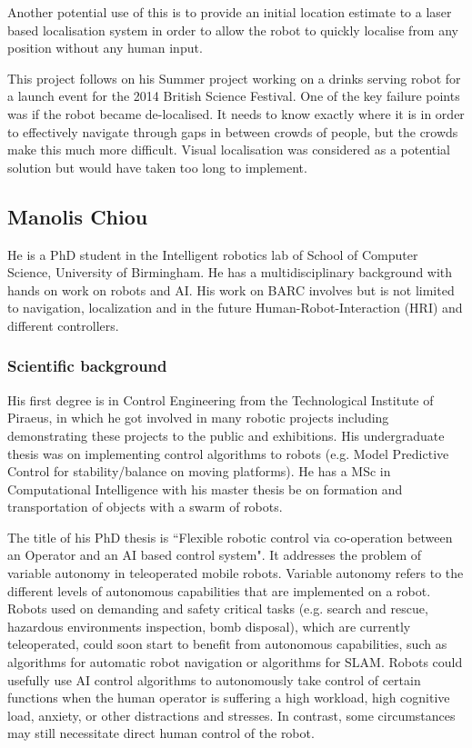 \documentclass[conference]{IEEEtran}
\begin{document}
Another potential use of this is to provide an initial location estimate to a laser based localisation system in order to allow the robot to quickly localise from any position without any human input.

This project follows on his Summer project working on a drinks serving robot for a launch event for the 2014 British Science Festival. One of the key failure points was if the robot became de-localised. It needs to know exactly where it is in order to effectively navigate through gaps in between crowds of people, but the crowds make this much more difficult. Visual localisation was considered as a potential solution but would have taken too long to implement.

\subsection{Manolis Chiou}

He is a PhD student in the Intelligent robotics lab of School of Computer Science, University of Birmingham. He has a multidisciplinary background with hands on work on robots and AI. His work on BARC involves but is not limited to navigation, localization and in the future Human-Robot-Interaction (HRI) and different controllers.

\subsubsection*{Scientific background}

His first degree is in Control Engineering from the Technological Institute of Piraeus, in which he got involved in many robotic projects including demonstrating these projects to the public and exhibitions. His undergraduate thesis was on implementing control algorithms to robots (e.g. Model Predictive Control for stability/balance on moving platforms). He has a MSc in Computational Intelligence with his master thesis be on formation and transportation of objects with a swarm of robots.  

The title of his PhD thesis is ``Flexible robotic control via co-operation between an Operator and an AI based control system". It addresses the problem of variable autonomy in teleoperated mobile robots. Variable autonomy refers to the different levels of autonomous capabilities that are implemented on a robot. Robots used on demanding and safety critical tasks (e.g. search and rescue, hazardous environments inspection, bomb disposal), which are currently teleoperated, could soon start to benefit from autonomous capabilities, such as algorithms for automatic robot navigation or algorithms for SLAM. Robots could usefully use AI control algorithms to autonomously take control of certain functions when the human operator is suffering a high workload, high cognitive load, anxiety, or other distractions and stresses. In contrast, some circumstances may still necessitate direct human control of the robot.
\end{document}
